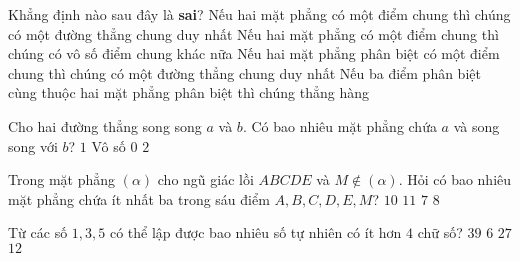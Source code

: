 \begin{ex}%
	Khẳng định nào sau đây là \textbf{sai}?
	\choice
	{\True  Nếu hai mặt phẳng có một điểm chung thì chúng có một đường thẳng chung duy nhất}
	{Nếu hai mặt phẳng có một điểm chung thì chúng có vô số điểm chung khác nữa}
	{Nếu hai mặt phẳng phân biệt có một điểm chung thì chúng có một đường thẳng chung duy nhất}
	{Nếu ba điểm phân biệt cùng thuộc hai mặt phẳng phân biệt thì chúng thẳng hàng}
\end{ex}

\begin{ex}%
	Cho hai đường thẳng song song $a$ và $b$. Có bao nhiêu mặt phẳng chứa $a$ và song song với $b$?
	\choice
	{$1$}
	{\True Vô số}
	{$0$}
	{$2$}
\end{ex}

\begin{ex}%
	Trong mặt phẳng $(\alpha)$ cho ngũ giác lồi $ABCDE$ và $M\notin (\alpha)$. Hỏi có bao nhiêu mặt phẳng chứa ít nhất ba trong sáu điểm $A, B, C, D, E, M$?
	\choice
	{$10$}
	{\True $11$}
	{$7$}
	{$8$}
\end{ex}

\begin{ex}%
	Từ các số $1, 3, 5$ có thể lập được bao nhiêu số tự nhiên có ít hơn $4$ chữ số?
	\choice
	{\True $39$}
	{$6$}
	{$27$}
	{$12$}
\end{ex}

